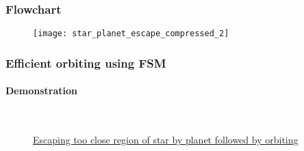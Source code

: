 \begin{frame}
\frametitle{Flowchart}
\begin{figure}[H]
	\centering
	\texttt{[image: star\_planet\_escape\_compressed\_2]}
\end{figure}
\end{frame}

\begin{frame}
\frametitle{Efficient orbiting using FSM}
\framesubtitle{Demonstration}
\begin{figure}[H]
	\begin{center}
	\\
	\vspace{0.4cm}
	\caption{\href{https://youtu.be/X6dGCLT0ho8}{Escaping too close region of star by planet followed by orbiting}}
	\label{fig:shape_formation_demo}
	\end{center}
\end{figure}
\end{frame}